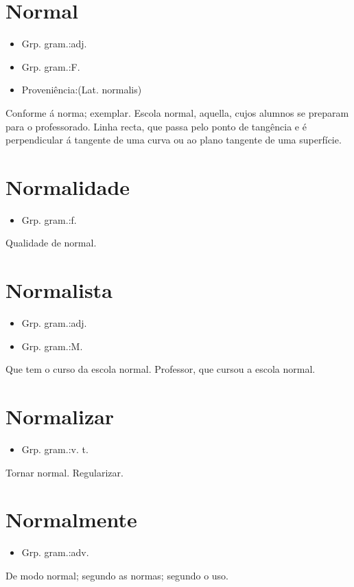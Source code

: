 \section{Normal}
\begin{itemize}
\item {Grp. gram.:adj.}
\end{itemize}
\begin{itemize}
\item {Grp. gram.:F.}
\end{itemize}
\begin{itemize}
\item {Proveniência:(Lat. \textunderscore normalis\textunderscore )}
\end{itemize}
Conforme á norma; exemplar.
\textunderscore Escola normal\textunderscore , aquella, cujos alumnos se preparam para o professorado.
Linha recta, que passa pelo ponto de tangência e é perpendicular á tangente de uma curva ou ao plano tangente de uma superfície.
\section{Normalidade}
\begin{itemize}
\item {Grp. gram.:f.}
\end{itemize}
Qualidade de normal.
\section{Normalista}
\begin{itemize}
\item {Grp. gram.:adj.}
\end{itemize}
\begin{itemize}
\item {Grp. gram.:M.}
\end{itemize}
Que tem o curso da escola normal.
Professor, que cursou a escola normal.
\section{Normalizar}
\begin{itemize}
\item {Grp. gram.:v. t.}
\end{itemize}
Tornar normal.
Regularizar.
\section{Normalmente}
\begin{itemize}
\item {Grp. gram.:adv.}
\end{itemize}
De modo normal; segundo as normas; segundo o uso.
